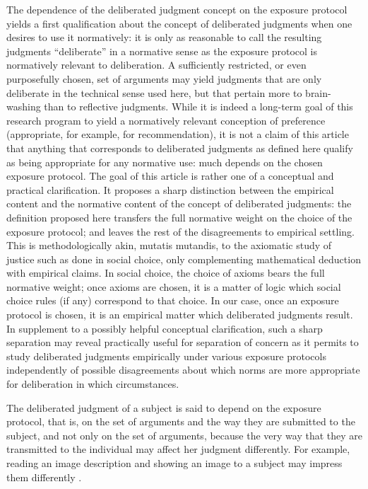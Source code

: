 \documentclass[version=last, pagesize, twoside=off, bibliography=totoc, DIV=calc, fontsize=12pt, a4paper, french, english]{scrartcl}
\begin{document}
The dependence of the deliberated judgment concept on the exposure protocol yields a first qualification about the concept of deliberated judgments when one desires to use it normatively: it is only as reasonable to call the resulting judgments “deliberate” in a normative sense as the exposure protocol is normatively relevant to deliberation. A sufficiently restricted, or even purposefully chosen, set of arguments may yield judgments that are only deliberate in the technical sense used here, but that pertain more to brain-washing than to reflective judgments. While it is indeed a long-term goal of this research program to yield a normatively relevant conception of preference (appropriate, for example, for recommendation), it is not a claim of this article that anything that corresponds to deliberated judgments as defined here qualify as being appropriate for any normative use: much depends on the chosen exposure protocol. The goal of this article is rather one of a conceptual and practical clarification. It proposes a sharp distinction between the empirical content and the normative content of the concept of deliberated judgments: the definition proposed here transfers the full normative weight on the choice of the exposure protocol; and leaves the rest of the disagreements to empirical settling. This is methodologically akin, mutatis mutandis, to the axiomatic study of justice such as done in social choice, only complementing mathematical deduction with empirical claims. In social choice, the choice of axioms bears the full normative weight; once axioms are chosen, it is a matter of logic which social choice rules (if any) correspond to that choice. In our case, once an exposure protocol is chosen, it is an empirical matter which deliberated judgments result.
In supplement to a possibly helpful conceptual clarification, such a sharp separation may reveal practically useful for separation of concern as it permits to study deliberated judgments empirically under various exposure protocols independently of possible disagreements about which norms are more appropriate for deliberation in which circumstances.

The deliberated judgment of a subject is said to depend on the exposure protocol, that is, on the set of arguments and the way they are submitted to the subject, and not only on the set of arguments, because the very way that they are transmitted to the individual may affect her judgment differently. For example, reading an image description and showing an image to a subject may impress them differently \citep{railton_facts_2003}.
\end{document}
